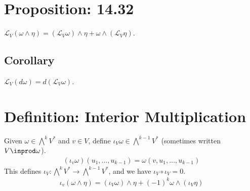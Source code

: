 \documentclass[11pt]{article}
\begin{document}
\section*{Proposition: 14.32}
\label{sec:org0974e0f}
\(\mathcal{L}_{V}(\omega\wedge\eta)=(\mathcal{L}_{V}\omega)\wedge\eta+\omega\wedge(\mathcal{L}_{V}\eta)\).\\
\subsection*{Corollary}
\label{sec:orgcf1a09b}
\(\mathcal{L}_{V}(d\omega)=d(\mathcal{L}_{V}\omega)\).\\
\section*{Definition: Interior Multiplication}
\label{sec:orgc4f5be1}
Given \(\omega\in\bigwedge^{k}V^{*}\) and \(v\in V\), define \(\iota_{V}\omega\in\bigwedge^{k-1}V^{*}\) (sometimes written \(V\inprod\omega\)).\\
\begin{align*}
  (\iota_{v}\omega)(u_{1},\ldots,u_{k-1})
  =\omega(v,u_{1},\ldots,u_{k-1})
\end{align*}
This defines \(\iota_{V}:\bigwedge^{k}V^{*}\to\bigwedge^{k-1}V^{*}\), and we have \(\iota_{V}\circ\iota_{V}=0\).\\
\begin{align*}
  \iota_{v}(\omega\wedge\eta)
  =(\iota_{V}\omega)\wedge\eta+(-1)^{k}\omega\wedge(\iota_{V}\eta)
\end{align*}
\end{document}
